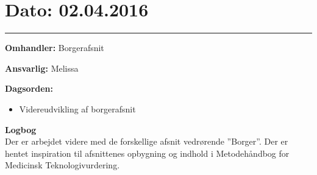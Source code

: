 \section{Dato: 02.04.2016}
\hrule

\textbf{Omhandler:} Borgerafsnit

\textbf{Ansvarlig:} Melissa

\textbf{Dagsorden:}
\begin{itemize}
	\item Videreudvikling af borgerafsnit
\end{itemize}

\textbf{Logbog}
\\
Der er arbejdet videre med de forskellige afsnit vedrørende ”Borger”. Der er hentet inspiration til afsnittenes opbygning og indhold i Metodehåndbog for Medicinsk Teknologivurdering. 
\\ \\



